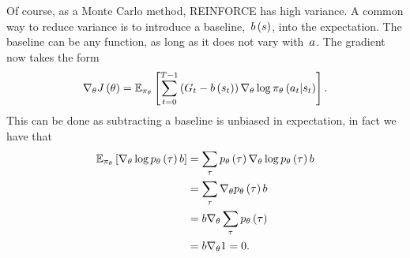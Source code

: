 Of course, as a Monte Carlo method, REINFORCE has high variance. A common way to reduce variance is to introduce a baseline,~${\baseline\left(\state\right)}$, into the expectation. The baseline can be any function, as long as it does not vary with~${\action}$. The gradient now takes the form
\begin{equation}
	\nabla_{\theta}J\left(\theta\right)=\mathbb{E}_{\pi_{\theta}}\left[\sum_{t=0}^{T-1}\left(G_{t}-b\left(s_{t}\right)\right)\nabla_{\theta}\log\pi_{\theta}\left(a_{t}\middle\vert s_{t}\right)\right].
\end{equation}
This can be done as subtracting a baseline is unbiased in expectation, in fact we have that
\begin{align}
	\mathbb{E}_{\pi_{\theta}}\left[\nabla_{\theta}\log p_{\theta}\left(\tau\right)b\right]
		&=\sum_{\tau}p_{\theta}\left(\tau\right)\nabla_{\theta}\log p_{\theta}\left(\tau\right)b \notag \\
		&=\sum_{\tau}\nabla_{\theta}p_{\theta}\left(\tau\right)b \notag \\
		&=b\nabla_{\theta}\sum_{\tau}p_{\theta}\left(\tau\right) \notag \\
		&=b\nabla_{\theta}1=0.
\end{align}

